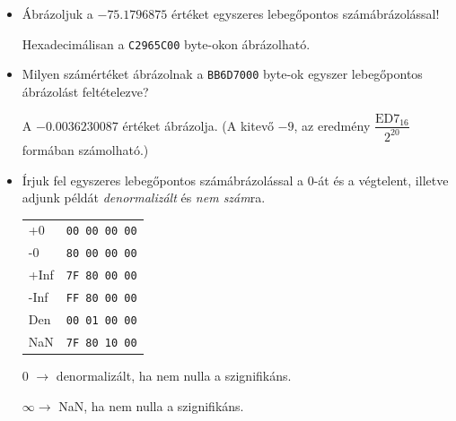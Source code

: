 \documentclass[a4paper]{article}
\newenvironment{solution}
{\color{RoyalBlue}}{\bigskip}
\newenvironment{comment}
{\color{Green}}{\bigskip}
\begin{document}
\begin{itemize}
\item Ábrázoljuk a $-75.1796875$ értéket egyszeres lebegőpontos számábrázolással!

\begin{solution}
Hexadecimálisan a \texttt{C2965C00} byte-okon ábrázolható.
\end{solution}

\item Milyen számértéket ábrázolnak a \texttt{BB6D7000} byte-ok egyszer lebegőpontos ábrázolást feltételezve?

\begin{solution}
A $-0.0036230087$ értéket ábrázolja. (A kitevő $-9$, az eredmény $\dfrac{\text{ED7}_{16}}{2^{20}}$ formában számolható.)
\end{solution}

\item Írjuk fel egyszeres lebegőpontos számábrázolással a 0-át és a végtelent, illetve adjunk példát \textit{denormalizált} és \textit{nem szám}ra.

\begin{solution}
\begin{tabular}{ll}
+0 & \texttt{00 00 00 00} \\
-0 & \texttt{80 00 00 00} \\
+Inf & \texttt{7F 80 00 00} \\
-Inf & \texttt{FF 80 00 00} \\
Den & \texttt{00 01 00 00} \\
NaN & \texttt{7F 80 10 00} \\
\end{tabular}
\end{solution}

\begin{comment}
0 $\rightarrow$ denormalizált, ha nem nulla a szignifikáns.

$\infty \rightarrow$ NaN, ha nem nulla a szignifikáns.
\end{comment}

\end{itemize}
\end{document}
